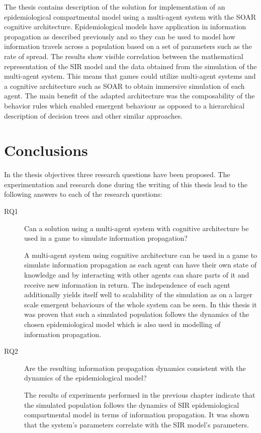 \label{chapter:conclusions}

The thesis contains description of the solution for implementation of an epidemiological compartmental model using a multi-agent system with the SOAR cognitive architecture.
Epidemiological models have application in information propagation as described previously and so they can be used to model how information travels across a population based on a set of parameters such as the rate of spread.
The results show visible correlation between the mathematical representation of the SIR model and the data obtained from the simulation of the multi-agent system.
This means that games could utilize multi-agent systems and a cognitive architecture such as SOAR to obtain immersive simulation of each agent.
The main benefit of the adapted architecture was the composability of the behavior rules which enabled emergent behaviour as opposed to a hierarchical description of decision trees and other similar approaches.

\section{Conclusions}

In the thesis objectives three research questions have been proposed.
The experimentation and research done during the writing of this thesis lead to the following answers to each of the research questions:

\begin{description}
    \item[RQ1] Can a solution using a multi-agent system with cognitive architecture be used in a game to simulate information propagation?
    \item[] A multi-agent system using cognitive architecture can be used in a game to simulate information propagation as each agent can have their own state of knowledge and by interacting with other agents can share parts of it and receive new information in return. The independence of each agent additionally yields itself well to scalability of the simulation as on a larger scale emergent behaviours of the whole system can be seen. In this thesis it was proven that such a simulated population follows the dynamics of the chosen epidemiological model which is also used in modelling of information propagation.
    \item[RQ2] Are the resulting information propagation dynamics consistent with the dynamics of the epidemiological model?
    \item[] The results of experiments performed in the previous chapter indicate that the simulated population follows the dynamics of SIR epidemiological compartmental model in terms of information propagation. It was shown that the system's parameters correlate with the SIR model's parameters.
\end{description}

